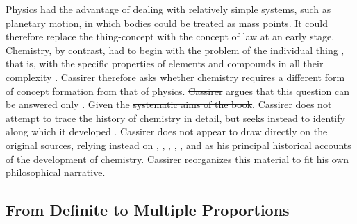 \documentclass[submitted,12pt]{article}
\providecommand{\DIFadd}[1]{{\protect\color{blue}\uwave{#1}}} %
\providecommand{\DIFdel}[1]{{\protect\color{red}\sout{#1}}}                      %
\providecommand{\DIFaddbegin}{} %
\providecommand{\DIFaddend}{} %
\providecommand{\DIFdelbegin}{} %
\providecommand{\DIFdelend}{} %
\begin{document}
Physics had the advantage of dealing with relatively simple systems, such as planetary motion, in which bodies could be treated as  mass points. It could therefore replace the thing-concept  with the concept of law  at an early stage. Chemistry, by contrast, had to begin with the problem of the individual thing , that is, with the specific properties of elements and compounds in all their complexity . Cassirer therefore asks whether chemistry requires a different form of concept formation from that of physics. \DIFdelbegin \DIFdel{Cassirer }\DIFdelend \DIFaddbegin \DIFadd{He }\DIFaddend argues that this question can be answered only  . Given the \DIFdelbegin \DIFdel{systematic aims of the book}\DIFdelend \DIFaddbegin \DIFadd{book's systematic aims}\DIFaddend , Cassirer does not attempt to trace the history of chemistry in detail, but seeks instead to identify  along which it developed .  Cassirer does not appear to draw directly on the original sources, relying instead on \citet{Wurtz1879}, \citet{Meyer1884}, \citet{Berthelot1885}, \citet{Ladenburg1902}, \citet{Duhem1902}, and \citet{Ostwald1906Leitlinien} as his principal historical accounts of the development of chemistry. Cassirer reorganizes this material to fit his own philosophical narrative.

\subsection{From Definite to Multiple Proportions}
\end{document}
